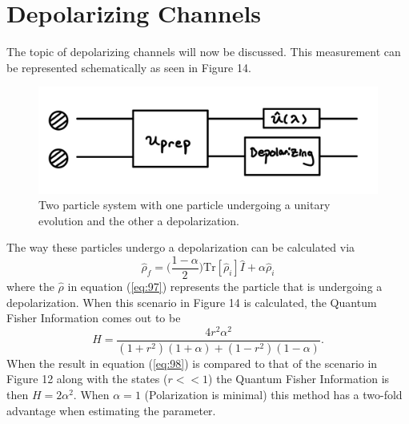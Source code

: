 \documentclass[twocolumn]{article}
\begin{document}
\section*{Depolarizing Channels}
The topic of depolarizing channels will now be discussed. This measurement can be represented schematically as seen in Figure 14.
\begin{figure}[h]
\begin{center}
\includegraphics[width=0.70\linewidth]{TP-Depolarizing.PNG}
\caption{Two particle system with one particle undergoing a unitary evolution and the other a depolarization.}
\end{center}
\end{figure}
\newline
The way these particles undergo a depolarization can be calculated via
\begin{equation}\label{eq:97}
\hat{\rho}_f=\Big(\frac{1-\alpha}{2}\Big)\text{Tr}[\hat{\rho}_i]\hat{I}+\alpha\hat{\rho}_i
\end{equation}
where the $\hat{\rho}$ in equation (\ref{eq:97}) represents the particle that is undergoing a depolarization. When this scenario in Figure 14 is calculated, the Quantum Fisher Information comes out to be
\begin{equation}\label{eq:98}
H=\frac{4r^2\alpha^2}{(1+r^2)(1+\alpha)+(1-r^2)(1-\alpha)}.
\end{equation}
When the result in equation (\ref{eq:98}) is compared to that of the scenario in Figure 12 along with the states ($r<<1$) the Quantum Fisher Information is then $H=2\alpha^2$. When $\alpha=1$ (Polarization is minimal) this method has a two-fold advantage when estimating the parameter.
\end{document}
